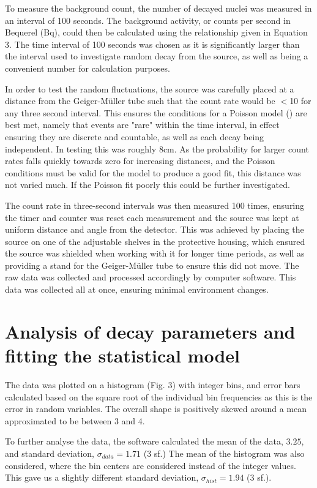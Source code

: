 \documentclass[11pt]{article}
\begin{document}
\noindent To measure the background count, the number of decayed nuclei was measured in an interval of 100 seconds. The background activity, or counts per second in Bequerel (Bq), could then be calculated using the relationship given in Equation 3. The time interval of 100 seconds was chosen as it is significantly larger than the interval used to investigate random decay from the source, as well as being a convenient number for calculation purposes.

\noindent In order to test the random fluctuations, the  source was carefully placed at a distance from the Geiger-Müller tube such that the count rate would be $<$10 for any three second interval. This ensures the conditions for a Poisson model (\cite{thompson2001poisson}) are best met, namely that events are "rare" within the time interval, in effect ensuring they are discrete and countable, as well as each decay being independent. In testing this was roughly 8cm. As the probability for larger count rates falls quickly towards zero for increasing distances, and the Poisson conditions must be valid for the model to produce a good fit, this distance was not varied much. If the Poisson fit poorly this could be further investigated.

\noindent The count rate in three-second intervals was then measured 100 times, ensuring the timer and counter was reset each measurement and the source was kept at uniform distance and angle from the detector. This was achieved by placing the source on one of the adjustable shelves in the protective housing, which ensured the source was shielded when working with it for longer time periods, as well as providing a stand for the Geiger-Müller tube to ensure this did not move. The raw data was collected and processed accordingly by computer software. This data was collected all at once, ensuring minimal environment changes.
\section{Analysis of decay parameters and fitting the statistical model}
The data was plotted on a histogram (Fig. 3) with integer bins, and error bars calculated based on the square root of the individual bin frequencies as this is the error in random variables.  The overall shape is positively skewed around a mean approximated to be between 3 and 4.

\noindent To further analyse the data, the software calculated the mean of the data, $3.25$, and standard deviation, $\sigma_{data} = 1.71 $ (3 sf.)
The mean of the histogram was also considered, where the bin centers are considered instead of the integer values. This gave us a slightly different standard deviation, $\sigma_{hist} = 1.94$ (3 sf.). 
\end{document}
